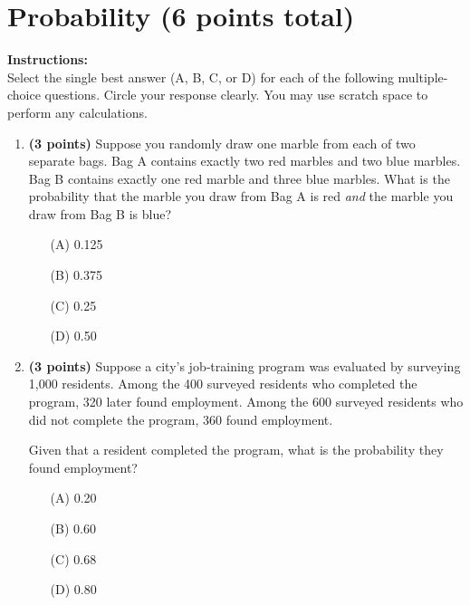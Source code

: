 \documentclass{article}
\newcommand{\blankbox}[2][3cm]{%
    \vspace{-0.5em}
    \begin{figure}[H]
        \makebox[\linewidth]{%
            \begin{tcolorbox}[
                colback=white,
                colframe=white,  %
                width=#2, %
                height=#1,
                boxrule=0.2mm
            ]
            \end{tcolorbox}
        }
    \end{figure}
    \vspace{-2em}
}
\begin{document}
\section{Probability (6 points total)}
\noindent\textbf{Instructions:} \\
Select the single best answer (A, B, C, or D) for each of the following multiple-choice questions. Circle your response clearly. You may use scratch space to perform any calculations.
\begin{enumerate}


\item \textbf{(3 points)} Suppose you randomly draw one marble from each of two separate bags. Bag A contains exactly two red marbles and two blue marbles. Bag B contains exactly one red marble and three blue marbles. What is the probability that the marble you draw from Bag A is red \emph{and} the marble you draw from Bag B is blue?
\begin{enumerate}
  \item[(A)] 0.125            %
  \item[(B)] 0.375            %
  \item[(C)] 0.25             %
  \item[(D)] 0.50             %
\end{enumerate} \blankbox[3.5cm]{1.0\linewidth}

\item \textbf{(3 points)}  Suppose a city’s job‐training program was evaluated by surveying 1,000 residents.
Among the 400 surveyed residents who completed the program, 320 later found employment.
Among the 600 surveyed residents who did not complete the program, 360 found employment.

Given that a resident completed the program, what is the probability they found employment?

\begin{enumerate}
  \item[(A)] 0.20
  \item[(B)] 0.60
  \item[(C)] 0.68
  \item[(D)] 0.80
\end{enumerate}



\end{enumerate}
\end{document}
